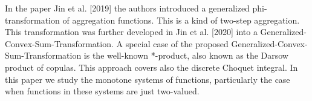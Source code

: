 
In the paper  Jin et al. [2019] the authors introduced a generalized phi-transformation of aggregation functions. This is a kind of two-step aggregation. This transformation was further developed in  Jin et al. [2020] into a Generalized-Convex-Sum-Transformation. A special case of the proposed  Generalized-Convex-Sum-Transformation is the well-known *-product, also known as the Darsow product of copulas. This approach covers also the discrete Choquet integral. In this paper we  study the monotone systems of functions, particularly the case when functions in these systems are just two-valued.

	
